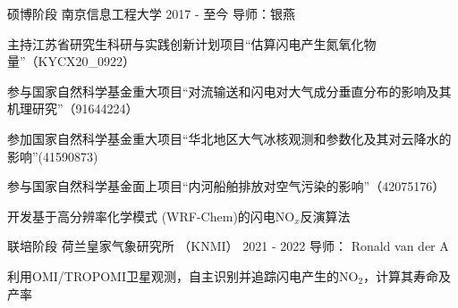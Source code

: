 

\begin{cventries}

  \cventry
    {硕博阶段} %
    {南京信息工程大学} %
    {2017 - 至今} %
    {导师：银燕} %
    {
      \begin{cvitems} %
        \item {主持江苏省研究生科研与实践创新计划项目“估算闪电产生氮氧化物量”（KYCX20\_0922）}
        \item {参与国家自然科学基金重大项目“对流输送和闪电对大气成分垂直分布的影响及其机理研究”（91644224）}
        \item {参加国家自然科学基金重大项目“华北地区大气冰核观测和参数化及其对云降水的影响”(41590873)}
        \item {参与国家自然科学基金面上项目“内河船舶排放对空气污染的影响”（42075176）}
        \item {开发基于高分辨率化学模式 (WRF-Chem)的闪电NO$_x$反演算法}
      \end{cvitems}
    }

  \cventry
    {联培阶段} %
    {荷兰皇家气象研究所 （KNMI）} %
    {2021 - 2022} %
    {导师： Ronald van der A} %
    {
      \begin{cvitems} %
        \item {利用OMI/TROPOMI卫星观测，自主识别并追踪闪电产生的NO$_2$，计算其寿命及产率}
      \end{cvitems}
    }



\end{cventries}
